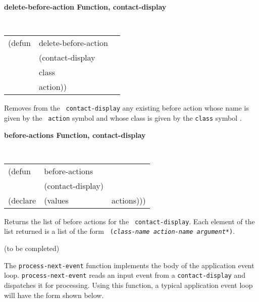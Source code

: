 \documentclass[twoside]{book}
\begin{document}
\begin{sloppy}
\begin{flushright}
{}\end{flushright}

{\samepage
{\large {\bf delete-before-action \hfill Function, contact-display}} 
\begin{flushright} \parbox[t]{6.125in}{
\tt
\begin{tabular}{lll}
\raggedright
(defun & delete-before-action & \\ 
& (contact-display\\
& class\\
& action))
\end{tabular}
\rm

}\end{flushright}}


\begin{flushright} \parbox[t]{6.125in}{ Removes from the {\tt
contact-display} any existing before action whose name is given by the {\tt
action} symbol and whose class is given by the {\tt class} symbol .

}\end{flushright}


{\large {\bf before-actions \hfill Function, contact-display}} 
\begin{flushright} \parbox[t]{6.125in}{
\tt
\begin{tabular}{lll}
\raggedright
(defun & before-actions & \\ 
& (contact-display)\\
(declare &(values  & actions)))
\end{tabular}
\rm

}\end{flushright}


\begin{flushright} \parbox[t]{6.125in}{
Returns the list of before actions for the {\tt
contact-display}. Each element of the list returned is a list of the form {\tt
({\em class-name action-name argument*})}.

}\end{flushright}



(to be completed)

{\samepage
{}
The {\tt process-next-event} function implements the body of the application event
loop.
{\tt process-next-event} reads an input
event from a {\tt contact-display} and
dispatches it for processing.
Using this function, a typical application event loop will have the form shown
below. 
}


\end{sloppy}
\end{document}
